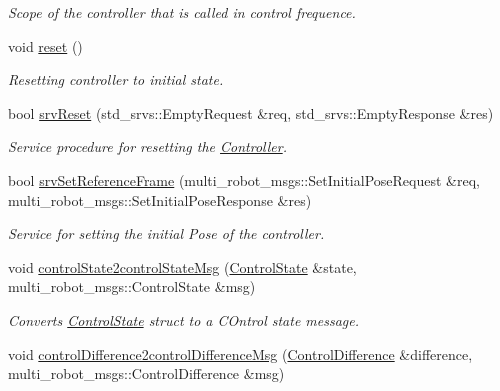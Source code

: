 \begin{DoxyCompactItemize}
\begin{DoxyCompactList}\small\item\em Scope of the controller that is called in control frequence. \end{DoxyCompactList}\item 
void \hyperlink{classController_ab5515748f1b0c82f015e039c817ee5f7}{reset} ()\hypertarget{classController_ab5515748f1b0c82f015e039c817ee5f7}{}\label{classController_ab5515748f1b0c82f015e039c817ee5f7}

\begin{DoxyCompactList}\small\item\em Resetting controller to initial state. \end{DoxyCompactList}\item 
bool \hyperlink{classController_a140aa1ee895337d776f88682640c0746}{srv\+Reset} (std\+\_\+srvs\+::\+Empty\+Request \&req, std\+\_\+srvs\+::\+Empty\+Response \&res)
\begin{DoxyCompactList}\small\item\em Service procedure for resetting the \hyperlink{classController}{Controller}. \end{DoxyCompactList}\item 
bool \hyperlink{classController_ab1564849c5f896db6e7f5e5fda42fcc3}{srv\+Set\+Reference\+Frame} (multi\+\_\+robot\+\_\+msgs\+::\+Set\+Initial\+Pose\+Request \&req, multi\+\_\+robot\+\_\+msgs\+::\+Set\+Initial\+Pose\+Response \&res)
\begin{DoxyCompactList}\small\item\em Service for setting the initial Pose of the controller. \end{DoxyCompactList}\item 
void \hyperlink{classController_a753fe3680abc7c9ba3040f6fcb638ac2}{control\+State2control\+State\+Msg} (\hyperlink{structController_1_1ControlState}{Control\+State} \&state, multi\+\_\+robot\+\_\+msgs\+::\+Control\+State \&msg)
\begin{DoxyCompactList}\small\item\em Converts \hyperlink{structController_1_1ControlState}{Control\+State} struct to a C\+Ontrol state message. \end{DoxyCompactList}\item 
void \hyperlink{classController_a866cee7328e1318e118c884a850a0e34}{control\+Difference2control\+Difference\+Msg} (\hyperlink{classController_a75a1e2f93842f65d1263f7d3c2fd8898}{Control\+Difference} \&difference, multi\+\_\+robot\+\_\+msgs\+::\+Control\+Difference \&msg)

\end{DoxyCompactItemize}
